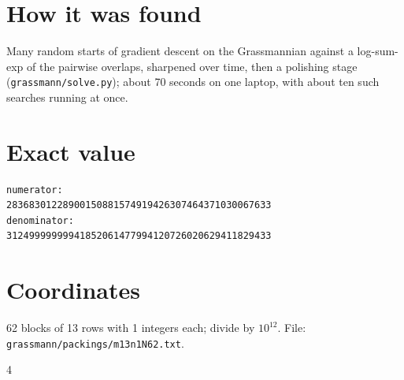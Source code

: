 \documentclass[11pt,a4paper]{article}
\begin{document}
\section{How it was found}
Many random starts of gradient descent on the Grassmannian against a log-sum-exp of the pairwise overlaps, sharpened over time, then a polishing stage (\texttt{grassmann/solve.py}); about 70 seconds on one laptop, with about ten such searches running at once.


\appendix
\section{Exact value}
{\small
\begin{verbatim}
numerator:
28368301228900150881574919426307464371030067633
denominator:
31249999999941852061477994120726020629411829433
\end{verbatim}}

\section{Coordinates}
62 blocks of 13 rows with 1 integers each; divide by $10^{12}$. File: \texttt{grassmann/packings/m13n1N62.txt}.
{\tiny
\begin{multicols}{4}
\end{multicols}}
\end{document}
